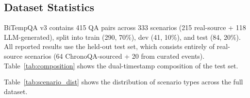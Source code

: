 \subsection{Dataset Statistics}
BiTempQA v3 contains 415 QA pairs across 333 scenarios (215 real-source + 118 LLM-generated), split into train (290, 70\%), dev (41, 10\%), and test (84, 20\%).
All reported results use the held-out test set, which consists entirely of real-source scenarios (64 ChronoQA-sourced + 20 from curated events).
Table~\ref{tab:composition} shows the dual-timestamp composition of the test set.

\begin{table}[t]
\centering
{}
\caption{Dual-timestamp composition of the BiTempQA v3 test set (84 questions). Over half of the questions require reasoning about both $t_e$ and $t_r$.}
\label{tab:composition}
\end{table}

Table~\ref{tab:scenario_dist} shows the distribution of scenario types across the full dataset.

